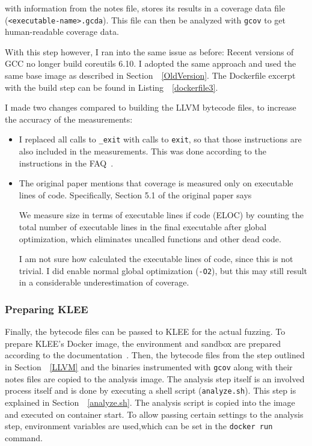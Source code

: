 \documentclass{article}
\let\savedCite=\cite
\renewcommand{\cite}{\unskip~\savedCite}
\let\savedRef=\ref
\renewcommand{\ref}{\unskip~\savedRef}
\begin{document}

\begin{multicols}{2}

    with information from the notes file, stores its results in a coverage data file (\lstinline{<executable-name>.gcda}). This file can then be analyzed with \lstinline{gcov} to get human-readable coverage data.

    With this step however, I ran into the same issue as before: Recent versions of GCC no longer build coreutils 6.10. I adopted the same approach and used the same base image as described in Section~\ref{OldVersion}. The Dockerfile excerpt with the build step can be found in Listing~\ref{dockerfile3}.

    I made two changes compared to building the LLVM bytecode files, to increase the accuracy of the measurements:
    \begin{itemize}
        \item I replaced all calls to \lstinline{_exit} with calls to \lstinline{exit}, so that those instructions are also included in the measurements. This was done according to the instructions in the FAQ\cite{KLEEFAQ}.
        \item The original paper mentions that coverage is measured only on executable lines of code. Specifically, Section 5.1 of the original paper says
              \begin{displayquote}
                  We measure size in terms of executable lines if code (ELOC) by counting the total number of executable lines in the final executable after global optimization, which eliminates uncalled functions and other dead code.\cite{KLEE}
              \end{displayquote}
              I am not sure how \citeauthor{KLEE} calculated the executable lines of code, since this is not trivial. I did enable normal global optimization (\lstinline{-O2}), but this may still result in a considerable underestimation of coverage.
    \end{itemize}


    \subsubsection{Preparing KLEE}

    Finally, the bytecode files can be passed to KLEE for the actual fuzzing. To prepare KLEE's Docker image, the environment and sandbox are prepared according to the documentation\cite{KLEEFAQ}. Then, the bytecode files from the step outlined in Section~\ref{LLVM} and the binaries instrumented with \lstinline{gcov} along with their notes files are copied to the analysis image. The analysis step itself is an involved process itself and is done by executing a shell script (\lstinline{analyze.sh}). This step is explained in Section~\ref{analyze.sh}. The analysis script is copied into the image and executed on container start. To allow passing certain settings to the analysis step, environment variables are used,which can be set in the \lstinline{docker run} command.


\end{multicols}
\end{document}

